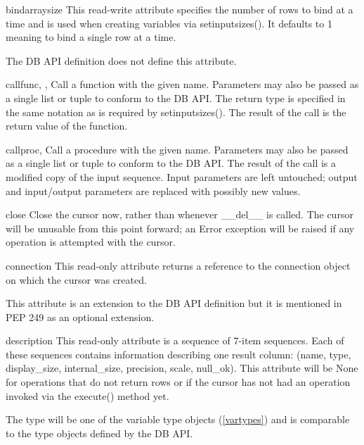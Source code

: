 \documentclass{manual}
\begin{document}
\begin{datadesc}{bindarraysize}
  This read-write attribute specifies the number of rows to bind at a time and
  is used when creating variables via setinputsizes(). It defaults to 1 meaning
  to bind a single row at a time.

   The DB API definition does not define this attribute.
\end{datadesc}

\begin{funcdesc}{callfunc}{, , }
  Call a function with the given name. Parameters may also be passed as a
  single list or tuple to conform to the DB API. The return type is specified
  in the same notation as is required by setinputsizes(). The result of the
  call is the return value of the function.
\end{funcdesc}

\begin{funcdesc}{callproc}{, }
  Call a procedure with the given name. Parameters may also be passed as a
  single list or tuple to conform to the DB API. The result of the call is a
  modified copy of the input sequence. Input parameters are left untouched;
  output and input/output parameters are replaced with possibly new values.
\end{funcdesc}

\begin{funcdesc}{close}{}
  Close the cursor now, rather than whenever __del__ is called. The cursor will
  be unusable from this point forward; an Error exception will be raised if any
  operation is attempted with the cursor.
\end{funcdesc}

\begin{datadesc}{connection}
  This read-only attribute returns a reference to the connection object on
  which the cursor was created.

   This attribute is an extension to the DB API definition but it
  is mentioned in PEP 249 as an optional extension.
\end{datadesc}

\begin{datadesc}{description}
  This read-only attribute is a sequence of 7-item sequences. Each of these
  sequences contains information describing one result column: (name, type,
  display_size, internal_size, precision, scale, null_ok). This attribute will
  be None for operations that do not return rows or if the cursor has not had
  an operation invoked via the execute() method yet.

  The type will be one of the variable type objects (\ref{vartypes}) and is
  comparable to the type objects defined by the DB API.
\end{datadesc}
\end{document}
